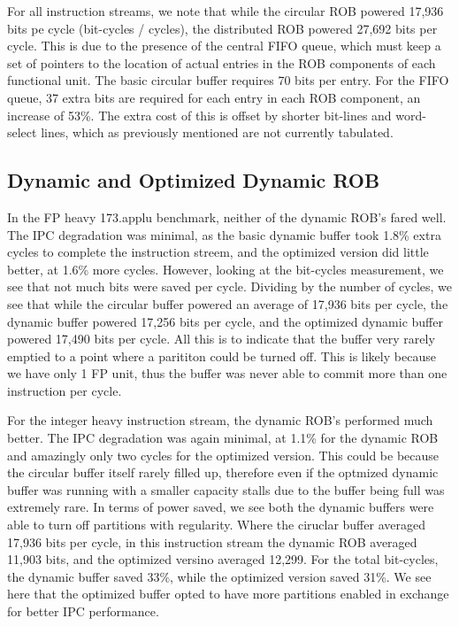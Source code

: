 For all instruction streams, we note that while the circular ROB powered 17,936 bits pe cycle (bit-cycles / cycles), the distributed ROB powered 27,692 bits per cycle. This is due to the presence of the central FIFO queue, which must keep a set of pointers to the location of actual entries in the ROB components of each functional unit. The basic circular buffer requires 70 bits per entry. For the FIFO queue, 37 extra bits are required for each entry in each ROB component, an increase of 53\%.
The extra cost of this is offset by shorter bit-lines and word-select lines, which as previously mentioned are not currently tabulated.


\subsection{Dynamic and Optimized Dynamic ROB}
In the FP heavy 173.applu benchmark, neither of the dynamic ROB's fared well. The IPC degradation was minimal, as the basic dynamic buffer took 1.8\% extra cycles to complete the instruction streem, and the optimized version did little better, at 1.6\% more cycles. However, looking at the bit-cycles measurement, we see that not much bits were saved per cycle. Dividing by the number of cycles, we see that while the circular buffer powered an average of 17,936 bits per cycle, the dynamic buffer powered 17,256 bits per cycle, and the optimized dynamic buffer powered 17,490 bits per cycle. All this is to indicate that the buffer very rarely emptied to a point where a parititon could be turned off. This is likely because we have only 1 FP unit, thus the buffer was never able to commit more than one instruction per cycle.

For the integer heavy instruction stream, the dynamic ROB's performed much better. The IPC degradation was again minimal, at 1.1\% for the dynamic ROB and amazingly only two cycles for the optimized version. This could be because the circular buffer itself rarely filled up, therefore even if the optmized dynamic buffer was running with a smaller capacity stalls due to the buffer being full was extremely rare. In terms of power saved, we see both the dynamic buffers were able to turn off partitions with regularity. Where the ciruclar buffer averaged 17,936 bits per cycle, in this instruction stream the dynamic ROB averaged 11,903 bits, and the optimized versino averaged 12,299. For the total bit-cycles, the dynamic buffer saved 33\%, while the optimized version saved 31\%. We see here that the optimized buffer opted to have more partitions enabled in exchange for better IPC performance.

